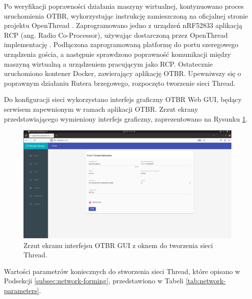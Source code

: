         Po weryfikacji poprawności działania maszyny wirtualnej, kontynuowano proces uruchomienia OTBR, wykorzystując instrukcję zamieszczoną na oficjalnej stronie projektu OpenThread \cite{otbr-docker}. Zaprogramowano jedno z urządzeń nRF52833 aplikacją RCP (ang. Radio Co-Processor), używając dostarczoną przez OpenThread implementację \cite{otbr-rcp-app}. Podłączona zaprogramowaną platformę do portu szeregowego urządzenia gościa, a następnie sprawdzono poprawność komunikacji między maszyną wirtualną a urządzeniem pracującym jako RCP. Ostatecznie uruchomiono kontener Docker, zawierający aplikację OTBR. Upewniwszy się o poprawnym działaniu Rutera brzegowego, rozpoczęto tworzenie sieci Thread.
    
        Do konfiguracji sieci wykorzystano interfejs graficzny OTBR Web GUI, będący serwisem zapewnionym w ramach aplikacji OTBR. Zrzut ekrany przedstawiającego wymieniony interfejs graficzny, zaprezentowano na Rysunku \ref{fig:otbr-web-gui}.
        
        \begin{figure}[H]
            \centering
            \includegraphics[width=0.8\linewidth]{graphics/screenshots/OTBR-web-gui.png}
            \caption{Zrzut ekranu interfejsu OTBR GUI z oknem do tworzenia sieci Thread.}
            \label{fig:otbr-web-gui}
        \end{figure}
        
        Wartości parametrów koniecznych do stworzenia sieci Thread, które opisano w Podsekcji \ref{subsec:network-forming}, przedstawiono w Tabeli \ref{tab:network-parameters}.
    
